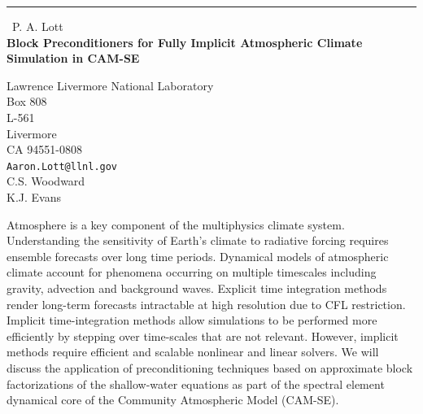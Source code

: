 \documentclass{report}
\begin{document}
\begin{center}
\rule{6in}{1pt} \
{\large P. A. Lott \\
{\bf  Block Preconditioners for Fully Implicit Atmospheric Climate Simulation in CAM-SE}}

Lawrence Livermore National Laboratory \\ Box 808 \\ L-561 \\ Livermore \\ CA 94551-0808
\\
{\tt Aaron.Lott@llnl.gov}\\
C.S. Woodward\\
K.J. Evans\end{center}

Atmosphere is a key component of the multiphysics climate system.
Understanding the sensitivity of Earth's climate to radiative forcing
requires ensemble forecasts over long time periods. Dynamical models of
atmospheric climate account for phenomena occurring on multiple
timescales including gravity, advection and background waves. Explicit
time integration methods render long-term forecasts intractable at high
resolution due to CFL restriction. Implicit time-integration methods
allow simulations to be performed more efficiently by stepping over
time-scales that are not relevant. However, implicit methods require
efficient and scalable nonlinear and linear solvers. We will discuss the
application of preconditioning techniques based on approximate block
factorizations of the shallow-water equations as part of the spectral
element dynamical core of the Community Atmospheric Model (CAM-SE).
\end{document}
